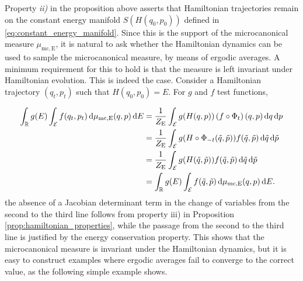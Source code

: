     Property \textit{ii)} in the proposition above asserts that Hamiltonian trajectories remain on the constant energy manifold $S(H(q_0,p_0))$ defined in \eqref{eq:constant_energy_manifold}.
    Since this is the support of the microcanonical measure $\mu_{\mathrm{mc,E}}$, it is natural to ask whether the Hamiltonian dynamics can be used to sample the microcanonical measure, by means of ergodic averages.
    A minimum requirement for this to hold is that the measure is left invariant under Hamiltonian evolution. This is indeed the case. Consider a Hamiltonian trajectory $(q_t,p_t)$ such that $H(q_0,p_0)=E$. For $g$ and $f$ test functions,

    \begin{align*}
        \int_{\mathbb{R}} g(E)\int_{\mathcal E}f(q_t,p_t)\,\mathrm{d}\mu_{\mathrm{mc,E}}(q,p)\,\mathrm{d}E&=\frac1{Z_{\mathrm{E}}}\int_{\mathcal E} g(H(q,p))\left(f\circ \Phi_t\right) (q,p)\,\mathrm{d}q\,\mathrm{d}p\\
        &=\frac1{Z_{\mathrm{E}}}\int_{\mathcal E} g(H\circ \Phi_{-t}(\tilde q,\tilde p))f (\tilde q,\tilde p)\,\mathrm{d}\tilde q\,\mathrm{d}\tilde p\\
        &=\frac1{Z_{\mathrm{E}}}\int_{\mathcal E} g(H(\tilde q,\tilde p))f(\tilde q,\tilde p)\,\mathrm{d}\tilde q\,\mathrm{d}\tilde p\\
        &=\int_{\mathbb{R}}g(E)\int_{\mathcal E}f(\tilde q,\tilde p)\,\mathrm{d}\mu_{\mathrm{mc,E}}(q,p)\,\mathrm{d}E.
    \end{align*}
    the absence of a Jacobian determinant term in the change of variables from the second to the third line follows from property iii) in Proposition \ref{prop:hamiltonian_properties}, while the passage from the second to the third line is justified by the energy conservation property.
    This shows that the microcanonical measure is invariant under the Hamiltonian dynamics, but it is easy to construct examples where ergodic averages fail to converge to the correct value, as the following simple example shows.

